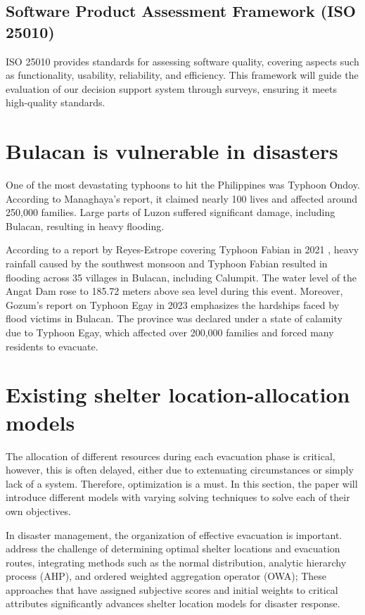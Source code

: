 \subsection{Software Product Assessment Framework (ISO 25010)}
	ISO 25010 provides standards for assessing software quality, covering aspects such as functionality, usability, reliability, and efficiency. This framework will guide the evaluation of our decision support system through surveys, ensuring it meets high-quality standards.

\section{Bulacan is vulnerable in disasters}
	One of the most devastating typhoons to hit the Philippines was Typhoon Ondoy. According to Managhaya's report, it claimed nearly 100 lives and affected around 250,000 families. Large parts of Luzon suffered significant damage, including Bulacan, resulting in heavy flooding. \parencite{James2009}

	According to a report by Reyes-Estrope covering Typhoon Fabian in 2021 \parencite{Carmela2021}, heavy rainfall caused by the southwest monsoon and Typhoon Fabian resulted in flooding across 35 villages in Bulacan, including Calumpit. The water level of the Angat Dam rose to 185.72 meters above sea level during this event. Moreover, Gozum's report on Typhoon Egay in 2023 \parencite{Iya2023} emphasizes the hardships faced by flood victims in Bulacan. The province was declared under a state of calamity due to Typhoon Egay, which affected over 200,000 families and forced many residents to evacuate.

\section{Existing shelter location-allocation models}
	The allocation of different resources during each evacuation phase is critical, however, this is often delayed, either due to extenuating circumstances or simply lack of a system. Therefore, optimization is a must. In this section, the paper will introduce different models with varying solving techniques to solve each of their own objectives.
	
	In disaster management, the organization of effective evacuation is important.\textcite{Yiying2022} address the challenge of determining optimal shelter locations and evacuation routes, integrating methods such as the normal distribution, analytic hierarchy process (AHP), and ordered weighted aggregation operator (OWA); These approaches that have assigned subjective scores and initial weights to critical attributes significantly advances shelter location models for disaster response.
	
